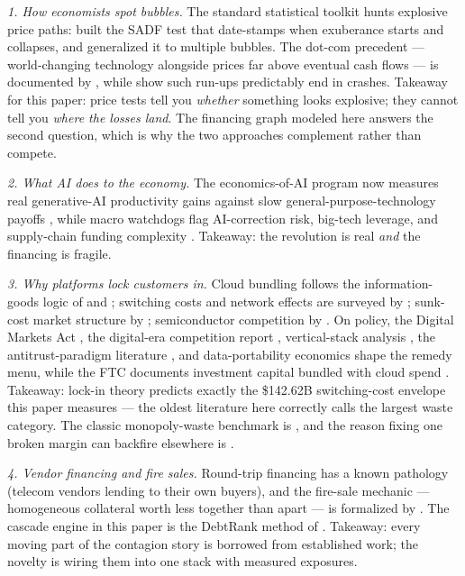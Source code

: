 \documentclass[11pt,a4paper]{article}
\begin{document}
\emph{1. How economists spot bubbles.} The standard statistical toolkit hunts
explosive price paths: \citet{phillips2011} built the SADF test that
date-stamps when exuberance starts and collapses, and
\citet{phillips2015} generalized it to multiple bubbles. The dot-com
precedent --- world-changing technology alongside prices far above eventual
cash flows --- is documented by \citet{ofek2003}, while \citet{greenwood2019}
show such run-ups predictably end in crashes.
Takeaway for this paper: price tests tell you \emph{whether} something looks
explosive; they cannot tell you \emph{where the losses land}. The financing
graph modeled here answers the second question, which is why the two
approaches complement rather than compete.

\emph{2. What AI does to the economy.} The economics-of-AI program
\citep{agrawal2018, agrawal2019} now measures real generative-AI
productivity gains \citep{brynjolfsson2025, noy2023} against slow
general-purpose-technology payoffs \citep{brynjolfsson2021, david1990},
while macro watchdogs flag AI-correction risk, big-tech leverage, and
supply-chain funding complexity \citep{imf2026b, imf2026, bis2026}.
Takeaway: the revolution is real \emph{and} the financing is fragile.

\emph{3. Why platforms lock customers in.} Cloud bundling follows the
information-goods logic of \citet{shapiro1999} and \citet{bakos2000};
switching costs and network effects are surveyed by \citet{farrell2007};
sunk-cost market structure by \citet{sutton1991}; semiconductor competition
by \citet{scherer1990}. On policy, the Digital Markets Act \citep{eu2022},
the digital-era competition report \citep{cremer2019}, vertical-stack
analysis \citep{hagiu2025}, the antitrust-paradigm literature
\citep{baker2019}, and data-portability economics \citep{kramer2020} shape
the remedy menu, while the FTC documents investment capital bundled with
cloud spend \citep{ftc2025}. Takeaway: lock-in theory predicts exactly the
\$142.62B switching-cost envelope this paper measures --- the oldest
literature here correctly calls the largest waste category. The classic
monopoly-waste benchmark is \citet{harberger1954}, and the reason fixing one
broken margin can backfire elsewhere is \citet{lipsey1956}.

\emph{4. Vendor financing and fire sales.} Round-trip financing has a known
pathology (telecom vendors lending to their own buyers), and the fire-sale
mechanic --- homogeneous collateral worth less together than apart --- is
formalized by \citet{shleifer1992}. The cascade engine in this paper is the
DebtRank method of \citet{battiston2012}. Takeaway: every moving part of the
contagion story is borrowed from established work; the novelty is wiring
them into one stack with measured exposures.
\end{document}
